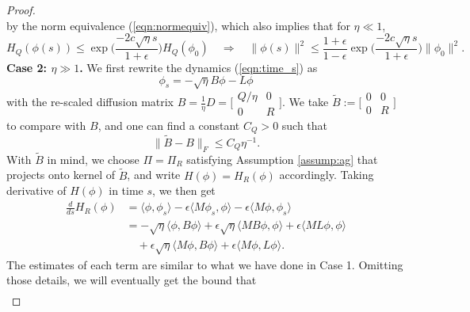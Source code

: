 \documentclass[10pt,a4paper]{amsart}
\begin{document}
\begin{proof}
\begin{equation}
\end{equation}
by the norm equivalence (\ref{eqn:normequiv}), which also implies that for $\eta\ll 1$,
\begin{equation}
    H_Q(\phi(s))\leq \exp\Big(\frac{-2c\sqrt{\eta}s}{1+\epsilon}\Big) H_Q(\phi_0) \quad \Longrightarrow \quad \|\phi(s)\|^2 \leq \frac{1+\epsilon}{1-\epsilon}\exp\Big(\frac{-2c\sqrt{\eta}s}{1+\epsilon}\Big) \|\phi_0\|^2.
\end{equation}
\textbf{Case 2: $\eta\gg 1$.}
We first rewrite the dynamics (\ref{eqn:time_s}) as
\begin{equation}
     \phi_s = -\sqrt{\eta }B \phi- L\phi
\end{equation}
with the re-scaled diffusion matrix  
$B= \frac{1}{\eta} D=  \bigl[ \begin{smallmatrix}
            Q/\eta & 0\\
            0 & R
 \end{smallmatrix}\bigr]$. We take 
$\tilde B  := \bigl[\begin{smallmatrix}
            0 & 0\\
            0 & R
        \end{smallmatrix}\bigr]$ to compare with $B$, and one can find a constant $C_Q>0$ such that 
        \begin{equation}
            \|\tilde B- B\|_F\leq C_Q \eta^{-1}.
        \end{equation}
With $\tilde B$ in mind, we choose $\Pi = \Pi_R$ satisfying Assumption \ref{assump:ag} that projects onto kernel of  $\tilde B$, and write $H(\phi) = H_R(\phi)$ accordingly. Taking derivative of $H(\phi)$ in time $s$, we then get
\begin{equation}
    \begin{aligned}
        \frac{d}{ds} H_R(\phi) &= \langle \phi, \phi_s\rangle-\epsilon\langle M\phi_s, \phi\rangle-\epsilon\langle M\phi, \phi_s\rangle\\
        &= -\sqrt{\eta}\langle \phi, B\phi\rangle + \epsilon\sqrt{\eta}\langle M B\phi, \phi\rangle+\epsilon\langle M L\phi, \phi\rangle\\
        &\quad +\epsilon\sqrt{\eta}\langle M\phi, B\phi\rangle+\epsilon\langle M\phi, L \phi\rangle.
    \end{aligned}
\end{equation}
The estimates of each term are similar to what we have done in Case 1. Omitting those details, we will eventually get the bound that
\begin{equation}
\begin{aligned}

\end{aligned}
\end{equation}
\end{proof}
\end{document}
